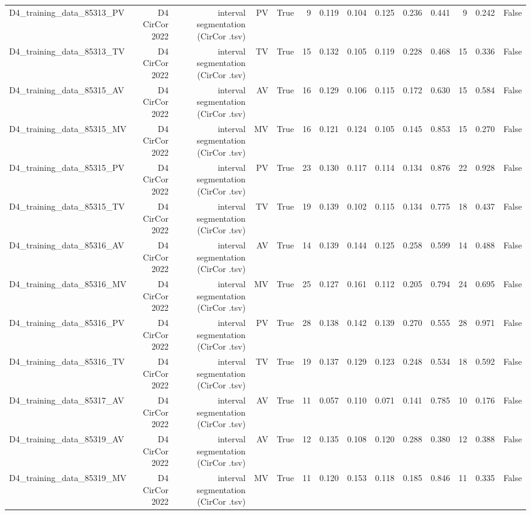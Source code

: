 \begin{table}[htbp]
\begin{tabular}{lrrrrrrrrrrrrr}
    D4\_training\_data\_85313\_PV & D4 CirCor 2022 & interval segmentation (CirCor .tsv) & PV & True & 9 & 0.119 & 0.104 & 0.125 & 0.236 & 0.441 & 9 & 0.242 & False \\
    D4\_training\_data\_85313\_TV & D4 CirCor 2022 & interval segmentation (CirCor .tsv) & TV & True & 15 & 0.132 & 0.105 & 0.119 & 0.228 & 0.468 & 15 & 0.336 & False \\
    D4\_training\_data\_85315\_AV & D4 CirCor 2022 & interval segmentation (CirCor .tsv) & AV & True & 16 & 0.129 & 0.106 & 0.115 & 0.172 & 0.630 & 15 & 0.584 & False \\
    D4\_training\_data\_85315\_MV & D4 CirCor 2022 & interval segmentation (CirCor .tsv) & MV & True & 16 & 0.121 & 0.124 & 0.105 & 0.145 & 0.853 & 15 & 0.270 & False \\
    D4\_training\_data\_85315\_PV & D4 CirCor 2022 & interval segmentation (CirCor .tsv) & PV & True & 23 & 0.130 & 0.117 & 0.114 & 0.134 & 0.876 & 22 & 0.928 & False \\
    D4\_training\_data\_85315\_TV & D4 CirCor 2022 & interval segmentation (CirCor .tsv) & TV & True & 19 & 0.139 & 0.102 & 0.115 & 0.134 & 0.775 & 18 & 0.437 & False \\
    D4\_training\_data\_85316\_AV & D4 CirCor 2022 & interval segmentation (CirCor .tsv) & AV & True & 14 & 0.139 & 0.144 & 0.125 & 0.258 & 0.599 & 14 & 0.488 & False \\
    D4\_training\_data\_85316\_MV & D4 CirCor 2022 & interval segmentation (CirCor .tsv) & MV & True & 25 & 0.127 & 0.161 & 0.112 & 0.205 & 0.794 & 24 & 0.695 & False \\
    D4\_training\_data\_85316\_PV & D4 CirCor 2022 & interval segmentation (CirCor .tsv) & PV & True & 28 & 0.138 & 0.142 & 0.139 & 0.270 & 0.555 & 28 & 0.971 & False \\
    D4\_training\_data\_85316\_TV & D4 CirCor 2022 & interval segmentation (CirCor .tsv) & TV & True & 19 & 0.137 & 0.129 & 0.123 & 0.248 & 0.534 & 18 & 0.592 & False \\
    D4\_training\_data\_85317\_AV & D4 CirCor 2022 & interval segmentation (CirCor .tsv) & AV & True & 11 & 0.057 & 0.110 & 0.071 & 0.141 & 0.785 & 10 & 0.176 & False \\
    D4\_training\_data\_85319\_AV & D4 CirCor 2022 & interval segmentation (CirCor .tsv) & AV & True & 12 & 0.135 & 0.108 & 0.120 & 0.288 & 0.380 & 12 & 0.388 & False \\
    D4\_training\_data\_85319\_MV & D4 CirCor 2022 & interval segmentation (CirCor .tsv) & MV & True & 11 & 0.120 & 0.153 & 0.118 & 0.185 & 0.846 & 11 & 0.335 & False \\

\end{tabular}
\end{table}
